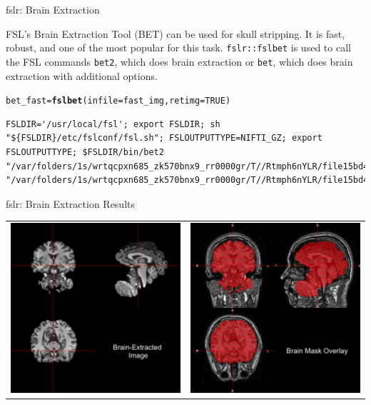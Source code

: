 \documentclass[11pt]{beamer}\usepackage[]{graphicx}\usepackage[]{color}
\makeatletter
\newcommand{\hlnum}[1]{\textcolor[rgb]{0.686,0.059,0.569}{#1}}%
\newcommand{\hlstd}[1]{\textcolor[rgb]{0.345,0.345,0.345}{#1}}%
\newcommand{\hlkwb}[1]{\textcolor[rgb]{0.69,0.353,0.396}{#1}}%
\newcommand{\hlkwc}[1]{\textcolor[rgb]{0.333,0.667,0.333}{#1}}%
\newcommand{\hlkwd}[1]{\textcolor[rgb]{0.737,0.353,0.396}{\textbf{#1}}}%
\newenvironment{kframe}{%
 \def\at@end@of@kframe{}%
 \ifinner\ifhmode%
  \def\at@end@of@kframe{\end{minipage}}%
  \begin{minipage}{\columnwidth}%
 \fi\fi%
 \def\FrameCommand##1{\hskip\@totalleftmargin \hskip-\fboxsep
 \colorbox{shadecolor}{##1}\hskip-\fboxsep
     \hskip-\linewidth \hskip-\@totalleftmargin \hskip\columnwidth}%
 \MakeFramed {\advance\hsize-\width
   \@totalleftmargin\z@ \linewidth\hsize
   \@setminipage}}%
 {\par\unskip\endMakeFramed%
 \at@end@of@kframe}
\newenvironment{knitrout}{}{} %
\makeatother
\begin{document}
\begin{frame}[fragile]{fslr: Brain Extraction}

FSL's Brain Extraction Tool (BET) can be used for skull stripping.  It is fast, robust, and one of the most popular for this task.  \verb|fslr::fslbet| is used to call the FSL commands \verb|bet2|, which does brain extraction or \verb|bet|, which does brain extraction with additional options.

\begin{knitrout}
\color{fgcolor}\begin{kframe}
\begin{alltt}
\hlstd{bet_fast} \hlkwb{=} \hlkwd{fslbet}\hlstd{(}\hlkwc{infile}\hlstd{=fast_img,} \hlkwc{retimg}\hlstd{=}\hlnum{TRUE}\hlstd{)}
\end{alltt}
\begin{verbatim}
FSLDIR='/usr/local/fsl'; export FSLDIR; sh "${FSLDIR}/etc/fslconf/fsl.sh"; FSLOUTPUTTYPE=NIFTI_GZ; export FSLOUTPUTTYPE; $FSLDIR/bin/bet2 "/var/folders/1s/wrtqcpxn685_zk570bnx9_rr0000gr/T//Rtmph6nYLR/file15bd47b62202e.nii.gz" "/var/folders/1s/wrtqcpxn685_zk570bnx9_rr0000gr/T//Rtmph6nYLR/file15bd42a50430d"  
\end{verbatim}
\end{kframe}
\end{knitrout}
\end{frame}




\begin{frame}[fragile]{fslr: Brain Extraction Results}

\begin{tabular}{cc}
\includegraphics[width=0.5\linewidth]{BET_Image.png} & \includegraphics[width=0.5\linewidth]{BET_Image_Overlay.png}
\end{tabular}

\end{frame}
\end{document}
